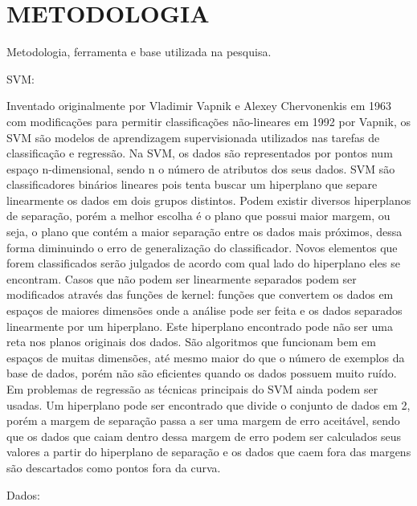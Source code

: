 
\chapter{METODOLOGIA}
\label{chap:metodologia}
Metodologia, ferramenta e base utilizada na pesquisa.

SVM:

Inventado originalmente por Vladimir Vapnik e Alexey Chervonenkis em 1963 com modificações para permitir classificações não-lineares em 1992 por Vapnik, os SVM são modelos de aprendizagem supervisionada utilizados nas tarefas de classificação e regressão.
Na SVM, os dados são representados por pontos num espaço n-dimensional, sendo n o número de atributos dos seus dados. SVM são classificadores binários lineares pois tenta buscar um hiperplano que separe linearmente os dados em dois grupos distintos. Podem existir diversos hiperplanos de separação, porém a melhor escolha é o plano que possui maior margem, ou seja, o plano que contém a maior separação entre os dados mais próximos, dessa forma diminuindo o erro de generalização do classificador. Novos elementos que forem classificados serão julgados de acordo com qual lado do hiperplano eles se encontram.
Casos que não podem ser linearmente separados podem ser modificados através das funções de kernel: funções que convertem os dados em espaços de maiores dimensões onde a análise pode ser feita e os dados separados linearmente por um hiperplano. Este hiperplano encontrado pode não ser uma reta nos planos originais dos dados.
São algoritmos que funcionam bem em espaços de muitas dimensões, até mesmo maior do que o número de exemplos da base de dados, porém não são eficientes quando os dados possuem muito ruído.
Em problemas de regressão as técnicas principais do SVM ainda podem ser usadas. Um hiperplano pode ser encontrado que divide o conjunto de dados em 2, porém a margem de separação passa a ser uma margem de erro aceitável, sendo que os dados que caiam dentro dessa margem de erro podem ser calculados seus valores a partir do hiperplano de separação e os dados que caem fora das margens são descartados como pontos fora da curva.

Dados:

